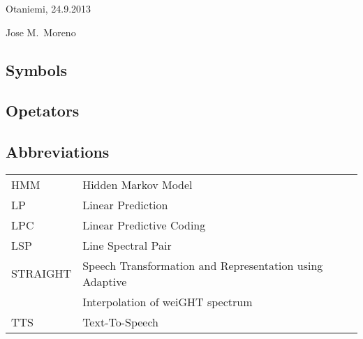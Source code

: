 \documentclass[english,12pt,a4paper,pdftex]{article}
\begin{document}

\makecoverpage

\newpage
%
%



\vspace{5cm}
Otaniemi, 24.9.2013

\vspace{5mm}
{\hfill Jose M.\ Moreno \hspace{1cm}}

\newpage

\thesistableofcontents

\newpage
\listoffigures

\newpage
\listoftables

\subsection*{Symbols}

\subsection*{Opetators}

\subsection*{Abbreviations}
\begin{tabular}{ll}
	HMM			& Hidden Markov Model\\
	LP			& Linear Prediction\\
	LPC 		& Linear Predictive Coding\\
	LSP			& Line Spectral Pair\\
	STRAIGHT	& Speech Transformation and Representation using Adaptive \\
				& Interpolation of weiGHT spectrum\\
	TTS			& Text-To-Speech
\end{tabular}
\cleardoublepage
\storeinipagenumber
{}
\setcounter{page}{1}
\end{document}
